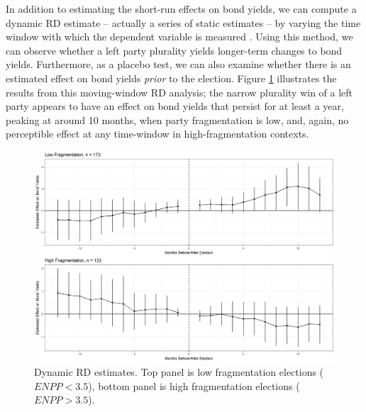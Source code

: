 \documentclass[12pt]{article}
\begin{document}
\begin{appendices}
        In addition to estimating the short-run effects on bond yields, we can compute a dynamic RD estimate -- actually a series of static estimates -- by varying the time window with which the dependent variable is measured \citep{Cellini2010}. Using this method, we can observe whether a left party plurality yields longer-term changes to bond yields. Furthermore, as a placebo test, we can also examine whether there is an estimated effect on bond yields \textit{prior} to the election. Figure \ref{fig:dynamicRD} illustrates the results from this moving-window RD analysis; the narrow plurality win of a left party appears to have an effect on bond yields that persist for at least a year, peaking at around 10 months, when party fragmentation is low, and, again, no perceptible effect at any time-window in high-fragmentation contexts. 

    \begin{figure} [h]
    	\centering
    	\includegraphics[width=\linewidth]{Figures/dynamicRD}
    	\caption{Dynamic RD estimates. Top panel is low fragmentation elections ($ENPP < 3.5$), bottom     panel is high fragmentation elections ($ENPP > 3.5$).}
    	\label{fig:dynamicRD}
    \end{figure}

\end{appendices}
\end{document}
